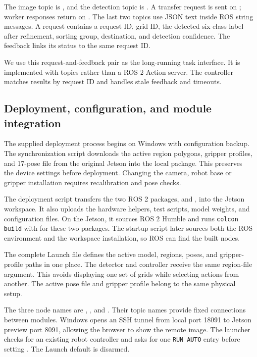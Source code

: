 The image topic is , and the detection topic is . A transfer request is sent on ; worker responses return on . The last two topics use JSON text inside ROS string messages. A request contains a request ID, grid ID, the detected six-class label after refinement, sorting group, destination, and detection confidence. The feedback links its status to the same request ID.

We use this request-and-feedback pair as the long-running task interface. It is implemented with topics rather than a ROS 2 Action server. The controller matches results by request ID and handles stale feedback and timeouts.

\subsection{Deployment, configuration, and module integration}
The supplied deployment process begins on Windows with configuration backup. The synchronization script downloads the active region polygons, gripper profiles, and 17-pose file from the original Jetson into the local package. This preserves the device settings before deployment. Changing the camera, robot base or gripper installation requires recalibration and pose checks.

The deployment script transfers the two ROS 2 packages,  and , into the Jetson workspace. It also uploads the hardware helpers, test scripts, model weights, and configuration files. On the Jetson, it sources ROS 2 Humble and runs \texttt{colcon build} with  for these two packages. The startup script later sources both the ROS environment and the workspace installation, so ROS can find the built nodes.

The complete Launch file defines the active model, regions, poses, and gripper-profile paths in one place. The detector and controller receive the same region-file argument. This avoids displaying one set of grids while selecting actions from another. The active pose file and gripper profile belong to the same physical setup. 

The three node names are , , and . Their topic names provide fixed connections between modules. Windows opens an SSH tunnel from local port 18091 to Jetson preview port 8091, allowing the browser to show the remote image. The launcher checks for an existing robot controller and asks for one \texttt{RUN AUTO} entry before setting . The Launch default is disarmed.

